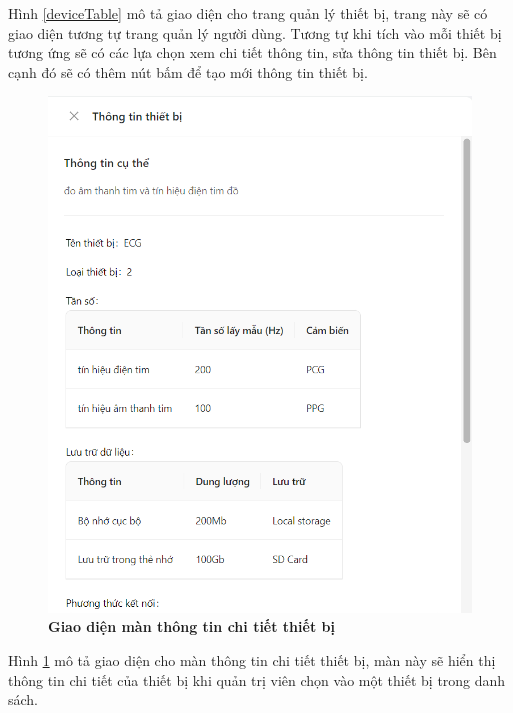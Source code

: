 Hình \ref{deviceTable} mô tả giao diện cho trang quản lý thiết bị, trang này sẽ có giao diện tương tự trang quản lý người dùng. 
Tương tự khi tích vào mỗi thiết bị tương ứng sẽ có các lựa chọn xem chi tiết thông tin, sửa thông tin thiết bị.
Bên cạnh đó sẽ có thêm nút bấm để tạo mới thông tin thiết bị.
\begin{figure}[H]
  \centering
  \includegraphics[scale=0.7]{Images/server/webUI/deviceInfo_1.png}
  \caption[Giao diện màn thông tin chi tiết thiết bị]{\bfseries \fontsize{12pt}{0pt}\selectfont Giao diện màn thông tin chi tiết thiết bị}
  \label{deviceInfo} %
\end{figure}

Hình \ref{deviceInfo} mô tả giao diện cho màn thông tin chi tiết thiết bị, màn này sẽ hiển thị thông tin
chi tiết của thiết bị khi quản trị viên chọn vào một thiết bị trong danh sách.

